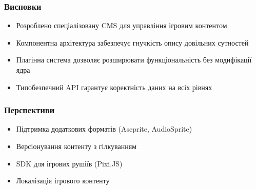 \documentclass[aspectratio=169]{beamer}
\begin{document}
\begin{frame}
\frametitle{Висновки}

  \begin{itemize}
    \item Розроблено спеціалізовану CMS для управління ігровим контентом
    \item Компонентна архітектура забезпечує гнучкість опису довільних сутностей
    \item Плагінна система дозволяє розширювати функціональність без модифікації ядра
    \item Типобезпечний API гарантує коректність даних на всіх рівнях
  \end{itemize}

\end{frame}

\begin{frame}
\frametitle{Перспективи}

  \begin{itemize}
    \item Підтримка додаткових форматів (Aseprite, AudioSprite)
    \item Версіонування контенту з гілкуванням
    \item SDK для ігрових рушіїв (Pixi.JS)
    \item Локалізація ігрового контенту
  \end{itemize}
\end{frame}

\begin{frame}[plain]
\end{frame}
\end{document}
